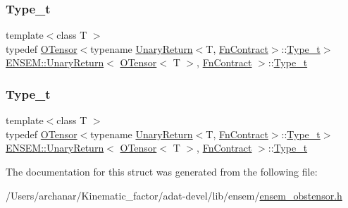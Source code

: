 \subsubsection{\texorpdfstring{Type\_t}{Type\_t}\hspace{0.1cm}{\footnotesize\ttfamily [2/3]}}
{\footnotesize\ttfamily template$<$class T $>$ \\
typedef \mbox{\hyperlink{classENSEM_1_1OTensor}{O\+Tensor}}$<$typename \mbox{\hyperlink{structENSEM_1_1UnaryReturn}{Unary\+Return}}$<$T, \mbox{\hyperlink{structENSEM_1_1FnContract}{Fn\+Contract}}$>$\+::\mbox{\hyperlink{structENSEM_1_1UnaryReturn_3_01OTensor_3_01T_01_4_00_01FnContract_01_4_a5b94783dc2f622ca8629f6318a2332ac}{Type\+\_\+t}}$>$ \mbox{\hyperlink{structENSEM_1_1UnaryReturn}{E\+N\+S\+E\+M\+::\+Unary\+Return}}$<$ \mbox{\hyperlink{classENSEM_1_1OTensor}{O\+Tensor}}$<$ T $>$, \mbox{\hyperlink{structENSEM_1_1FnContract}{Fn\+Contract}} $>$\+::\mbox{\hyperlink{structENSEM_1_1UnaryReturn_3_01OTensor_3_01T_01_4_00_01FnContract_01_4_a5b94783dc2f622ca8629f6318a2332ac}{Type\+\_\+t}}}

\mbox{\label{structENSEM_1_1UnaryReturn_3_01OTensor_3_01T_01_4_00_01FnContract_01_4_a5b94783dc2f622ca8629f6318a2332ac}} 
\subsubsection{\texorpdfstring{Type\_t}{Type\_t}\hspace{0.1cm}{\footnotesize\ttfamily [3/3]}}
{\footnotesize\ttfamily template$<$class T $>$ \\
typedef \mbox{\hyperlink{classENSEM_1_1OTensor}{O\+Tensor}}$<$typename \mbox{\hyperlink{structENSEM_1_1UnaryReturn}{Unary\+Return}}$<$T, \mbox{\hyperlink{structENSEM_1_1FnContract}{Fn\+Contract}}$>$\+::\mbox{\hyperlink{structENSEM_1_1UnaryReturn_3_01OTensor_3_01T_01_4_00_01FnContract_01_4_a5b94783dc2f622ca8629f6318a2332ac}{Type\+\_\+t}}$>$ \mbox{\hyperlink{structENSEM_1_1UnaryReturn}{E\+N\+S\+E\+M\+::\+Unary\+Return}}$<$ \mbox{\hyperlink{classENSEM_1_1OTensor}{O\+Tensor}}$<$ T $>$, \mbox{\hyperlink{structENSEM_1_1FnContract}{Fn\+Contract}} $>$\+::\mbox{\hyperlink{structENSEM_1_1UnaryReturn_3_01OTensor_3_01T_01_4_00_01FnContract_01_4_a5b94783dc2f622ca8629f6318a2332ac}{Type\+\_\+t}}}



The documentation for this struct was generated from the following file\+:\begin{DoxyCompactItemize}
\item 
/\+Users/archanar/\+Kinematic\+\_\+factor/adat-\/devel/lib/ensem/\mbox{\hyperlink{adat-devel_2lib_2ensem_2ensem__obstensor_8h}{ensem\+\_\+obstensor.\+h}}\end{DoxyCompactItemize}
